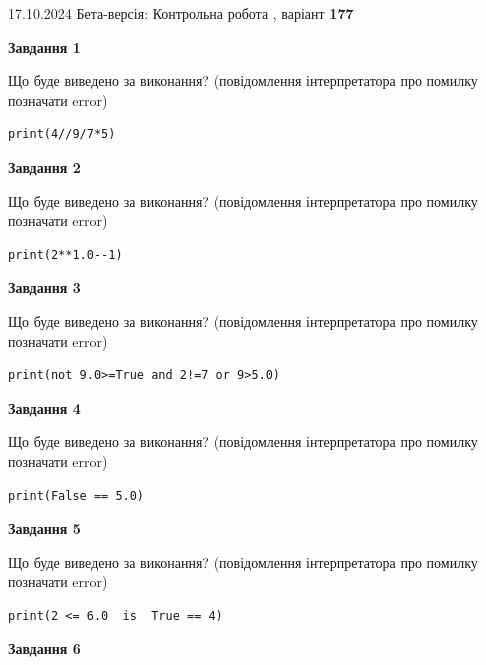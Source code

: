 \documentclass[12pt, ukrainian]{article}
\begin{document}
{\Large{17.10.2024 Бета-версія: Контрольна робота , варіант  \No \textbf { 177 }\par}}
{
\begin {large}
{\begin {center}\textbf{Завдання 1}\end {center}}

Що буде виведено за виконання? (повідомлення інтерпретатора про помилку позначати error)\par
\begin{verbatim}
print(4//9/7*5)
\end{verbatim}

{\begin {center}\textbf{Завдання 2}\end {center}}

Що буде виведено за виконання? (повідомлення інтерпретатора про помилку позначати error)\par
\begin{verbatim}
print(2**1.0--1)
\end{verbatim}

{\begin {center}\textbf{Завдання 3}\end {center}}

Що буде виведено за виконання? (повідомлення інтерпретатора про помилку позначати error)\par
\begin{verbatim}
print(not 9.0>=True and 2!=7 or 9>5.0)
\end{verbatim}

{\begin {center}\textbf{Завдання 4}\end {center}}

Що буде виведено за виконання? (повідомлення інтерпретатора про помилку позначати error)\par
\begin{verbatim}
print(False == 5.0)
\end{verbatim}

{\begin {center}\textbf{Завдання 5}\end {center}}

Що буде виведено за виконання? (повідомлення інтерпретатора про помилку позначати error)\par
\begin{verbatim}
print(2 <= 6.0  is  True == 4)
\end{verbatim}

{\begin {center}\textbf{Завдання 6}\end {center}}


\end{large}}
\end{document}
